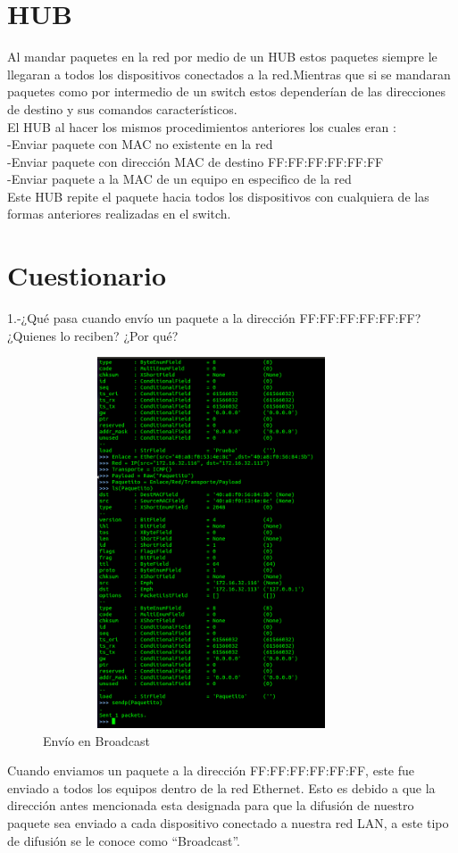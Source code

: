 \documentclass{udpreport}
\begin{document}
	\section{HUB}
	 	Al mandar paquetes en la red por medio de un HUB estos paquetes siempre 
 		le llegaran a todos los dispositivos conectados a la red.Mientras que si
 		se mandaran paquetes como por intermedio de un switch estos dependerían de 
 		las direcciones de destino  y sus comandos característicos.\\
 		El HUB al hacer  los mismos procedimientos anteriores los cuales eran :\\
 		-Enviar paquete con MAC no existente en la red\\
 		-Enviar paquete con dirección MAC de destino FF:FF:FF:FF:FF:FF\\
 		-Enviar paquete a la MAC de un equipo en especifico de la red\\
 		Este HUB repite el paquete hacia todos los dispositivos con cualquiera
 		de las formas anteriores realizadas en el switch.
 		\newpage
	\section{Cuestionario}
	
	  1.-¿Qué pasa cuando envío un paquete a la dirección FF:FF:FF:FF:FF:FF? ¿Quienes
	     lo reciben? ¿Por qué?\\
    	 	\begin{figure}[H]
	        	\centering
	        	\includegraphics[width=10cm, height=11cm]{EnvioPaquetito.png}
			\caption{Envío en Broadcast}
	 	\end{figure}
	     Cuando enviamos un paquete a la dirección FF:FF:FF:FF:FF:FF, este fue enviado a todos los equipos dentro de la red
	     Ethernet. Esto es debido a que la dirección antes mencionada esta designada para que la difusión de nuestro paquete sea
 	     enviado a cada dispositivo conectado a nuestra red LAN, a este tipo de difusión se le conoce como “Broadcast”.\\
 	     \newpage
 
\end{document}

